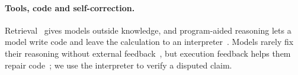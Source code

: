 \paragraph{Tools, code and self-correction.} Retrieval~\citep{lewis2020} gives models outside knowledge, and program-aided reasoning lets a model write code and leave the calculation to an interpreter~\citep{gao2023pal}. Models rarely fix their reasoning without external feedback~\citep{huang2024}, but execution feedback helps them repair code~\citep{chen2024selfdebug}; we use the interpreter to verify a disputed claim.
